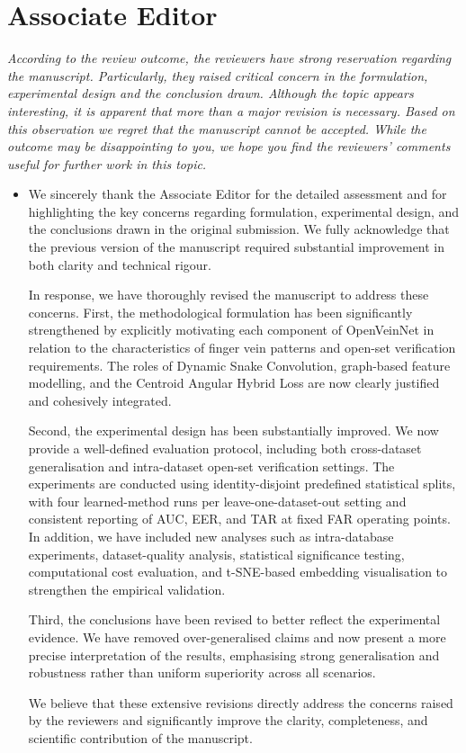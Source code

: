 \documentclass[11pt]{article}
\theoremstyle{remark}
\begin{document}
\color{blue} 
\section*{Associate Editor}
\textit{ According to the review outcome, the reviewers have strong reservation regarding the manuscript. Particularly, they raised critical concern in the formulation, experimental design and the conclusion drawn. Although the topic appears interesting, it is apparent that more than a major revision is necessary. Based on this observation we regret that the manuscript cannot be accepted. While the outcome may be disappointing to you, we hope you find the reviewers' comments useful for further work in this topic.
}
\color{black}
\begin{itemize}
	\item 

We sincerely thank the Associate Editor for the detailed assessment and for highlighting the key concerns regarding formulation, experimental design, and the conclusions drawn in the original submission. We fully acknowledge that the previous version of the manuscript required substantial improvement in both clarity and technical rigour.

In response, we have thoroughly revised the manuscript to address these concerns. First, the methodological formulation has been significantly strengthened by explicitly motivating each component of OpenVeinNet in relation to the characteristics of finger vein patterns and open-set verification requirements. The roles of Dynamic Snake Convolution, graph-based feature modelling, and the Centroid Angular Hybrid Loss are now clearly justified and cohesively integrated.

Second, the experimental design has been substantially improved. We now provide a well-defined evaluation protocol, including both cross-dataset generalisation and intra-dataset open-set verification settings. The experiments are conducted using identity-disjoint predefined statistical splits, with four learned-method runs per leave-one-dataset-out setting and consistent reporting of AUC, EER, and TAR at fixed FAR operating points. In addition, we have included new analyses such as intra-database experiments, dataset-quality analysis, statistical significance testing, computational cost evaluation, and t-SNE-based embedding visualisation to strengthen the empirical validation.

Third, the conclusions have been revised to better reflect the experimental evidence. We have removed over-generalised claims and now present a more precise interpretation of the results, emphasising strong generalisation and robustness rather than uniform superiority across all scenarios.

We believe that these extensive revisions directly address the concerns raised by the reviewers and significantly improve the clarity, completeness, and scientific contribution of the manuscript.

\end{itemize}
\end{document}
